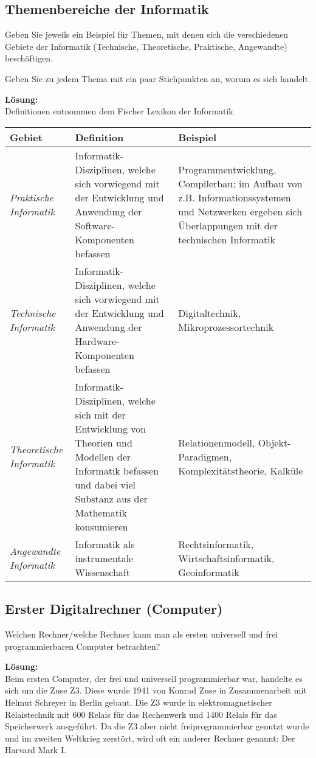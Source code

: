 \documentclass[11pt,a4paper,DIV=12]{scrartcl}
\newcommand{\loesung}{\textbf{Lösung:}\\}
\begin{document}
\subsection{Themenbereiche der Informatik}
Geben Sie jeweils ein Beispiel für Themen, mit denen sich die verschiedenen Gebiete der Informatik (Technische, Theoretische, Praktische, Angewandte) beschäftigen.

Geben Sie zu jedem Thema mit ein paar Stichpunkten an, worum es sich handelt.

\loesung
Definitionen entnommen dem Fischer Lexikon der Informatik
\newline

\begin{tabularx}{\textwidth}{l L L}
\toprule
\textbf{Gebiet} & \textbf{Definition} & \textbf{Beispiel}\\
\midrule
\emph{Praktische Informatik} & Informatik-Disziplinen, welche sich vorwiegend mit der Entwicklung und Anwendung der Software-Komponenten befassen & Programmentwicklung, Compilerbau; im Aufbau von z.B. Informationssystemen und Netzwerken ergeben sich Überlappungen mit der technischen Informatik \\
\emph{Technische Informatik} & Informatik-Disziplinen, welche sich vorwiegend mit der Entwicklung und Anwendung der Hardware-Komponenten befassen & Digitaltechnik, Mikroprozessortechnik \\
\emph{Theoretische Informatik} & Informatik-Disziplinen, welche sich mit der Entwicklung von Theorien und Modellen der Informatik befassen und dabei viel Substanz aus der Mathematik konsumieren & Relationenmodell, Objekt-Paradigmen, Komplexitätstheorie, Kalküle \\
\emph{Angewandte Informatik} & Informatik als instrumentale Wissenschaft & Rechtsinformatik, Wirtschaftsinformatik, Geoinformatik \\
\bottomrule
\end{tabularx}

\subsection{Erster Digitalrechner (Computer)}
Welchen Rechner/welche Rechner kann man als ersten universell und frei programmierbaren Computer betrachten?

\loesung
Beim ersten Computer, der frei und universell programmierbar war, handelte es sich um die Zuse Z3. Diese wurde 1941 von Konrad Zuse in Zusammenarbeit mit Helmut Schreyer in Berlin gebaut. Die Z3 wurde in elektromagnetischer Relaistechnik mit 600 Relais für das Rechenwerk und 1400 Relais für das Speicherwerk ausgeführt. Da die Z3 aber nicht freiprogrammierbar genutzt wurde und im zweiten Weltkrieg zerstört, wird oft ein anderer Rechner genannt: Der Harvard Mark I.
\end{document}
